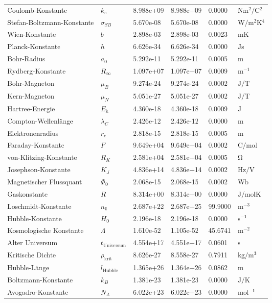 \documentclass[11pt,a4paper]{article}
\begin{document}
\begin{longtable}{>{\raggedright}p{}p{1.5cm}p{2cm}p{2.5cm}p{2cm}p{2.5cm}}
		Coulomb-Konstante & $k_e$ & 8.988e+09 & 8.988e+09 & 0.0000 & $\si{\newton \meter^2 \per \coulomb^2}$ \\
		Stefan-Boltzmann-Konstante & $\sigma_{SB}$ & 5.670e-08 & 5.670e-08 & 0.0000 & $\si{\watt \per \meter^2 \kelvin^4}$ \\
		Wien-Konstante & $b$ & 2.898e-03 & 2.898e-03 & 0.0023 & $\si{\meter \kelvin}$ \\
		Planck-Konstante & $h$ & 6.626e-34 & 6.626e-34 & 0.0000 & $\si{\joule \second}$ \\
		Bohr-Radius & $a_0$ & 5.292e-11 & 5.292e-11 & 0.0005 & $\si{\meter}$ \\
		Rydberg-Konstante & $R_\infty$ & 1.097e+07 & 1.097e+07 & 0.0009 & $\si{\meter^{-1}}$ \\
		Bohr-Magneton & $\mu_B$ & 9.274e-24 & 9.274e-24 & 0.0002 & $\si{\joule \per \tesla}$ \\
		Kern-Magneton & $\mu_N$ & 5.051e-27 & 5.051e-27 & 0.0002 & $\si{\joule \per \tesla}$ \\
		Hartree-Energie & $E_h$ & 4.360e-18 & 4.360e-18 & 0.0009 & $\si{\joule}$ \\
		Compton-Wellenlänge & $\lambda_C$ & 2.426e-12 & 2.426e-12 & 0.0000 & $\si{\meter}$ \\
		Elektronenradius & $r_e$ & 2.818e-15 & 2.818e-15 & 0.0005 & $\si{\meter}$ \\
		Faraday-Konstante & $F$ & 9.649e+04 & 9.649e+04 & 0.0002 & $\si{\coulomb \per \mole}$ \\
		von-Klitzing-Konstante & $R_K$ & 2.581e+04 & 2.581e+04 & 0.0005 & $\si{\ohm}$ \\
		Josephson-Konstante & $K_J$ & 4.836e+14 & 4.836e+14 & 0.0002 & $\si{\hertz \per \volt}$ \\
		Magnetischer Flussquant & $\Phi_0$ & 2.068e-15 & 2.068e-15 & 0.0002 & $\si{\weber}$ \\
		Gaskonstante & $R$ & 8.314e+00 & 8.314e+00 & 0.0000 & $\si{\joule \per \mole \kelvin}$ \\
		Loschmidt-Konstante & $n_0$ & 2.687e+22 & 2.687e+25 & 99.9000 & $\si{\meter^{-3}}$ \\
		Hubble-Konstante & $H_0$ & 2.196e-18 & 2.196e-18 & 0.0000 & $\si{\second^{-1}}$ \\
		Kosmologische Konstante & $\Lambda$ & 1.610e-52 & 1.105e-52 & 45.6741 & $\si{\meter^{-2}}$ \\
		Alter Universum & $t_{\text{Universum}}$ & 4.554e+17 & 4.551e+17 & 0.0601 & $\si{\second}$ \\
		Kritische Dichte & $\rho_{\text{krit}}$ & 8.626e-27 & 8.558e-27 & 0.7911 & $\si{\kilogram \per \meter^3}$ \\
		Hubble-Länge & $l_{\text{Hubble}}$ & 1.365e+26 & 1.364e+26 & 0.0862 & $\si{\meter}$ \\
		Boltzmann-Konstante & $k_B$ & 1.381e-23 & 1.381e-23 & 0.0000 & $\si{\joule \per \kelvin}$ \\
		Avogadro-Konstante & $N_A$ & 6.022e+23 & 6.022e+23 & 0.0000 & $\si{\mole^{-1}}$ \\
	\end{longtable}
	
\end{document}
